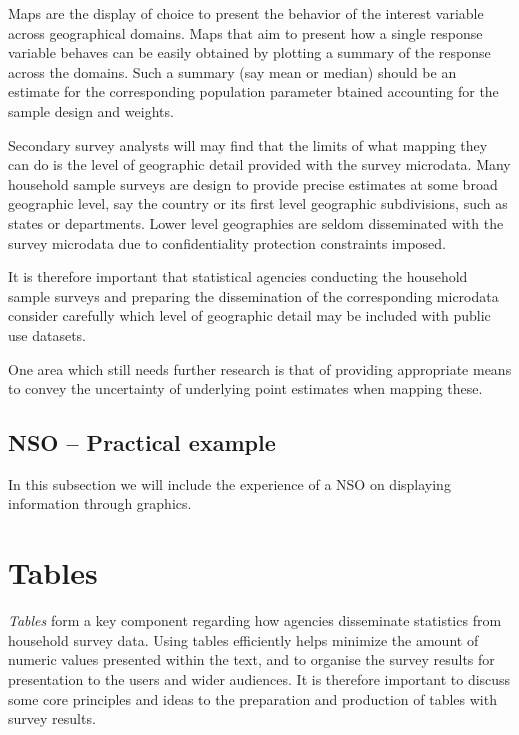 \documentclass[
  12pt,
]{book}
\begin{document}
Maps are the display of choice to present the behavior of the interest variable across geographical domains. Maps that aim to present how a single response variable behaves can be easily obtained by plotting a summary of the response across the domains. Such a summary (say mean or median) should be an estimate for the corresponding population parameter btained accounting for the sample design and weights.

Secondary survey analysts will may find that the limits of what mapping they can do is the level of geographic detail provided with the survey microdata. Many household sample surveys are design to provide precise estimates at some broad geographic level, say the country or its first level geographic subdivisions, such as states or departments. Lower level geographies are seldom disseminated with the survey microdata due to confidentiality protection constraints imposed.

It is therefore important that statistical agencies conducting the household sample surveys and preparing the dissemination of the corresponding microdata consider carefully which level of geographic detail may be included with public use datasets.

One area which still needs further research is that of providing appropriate means to convey the uncertainty of underlying point estimates when mapping these.

\hypertarget{nso-practical-example-3}{%
\section{NSO -- Practical example}\label{nso-practical-example-3}}

In this subsection we will include the experience of a NSO on displaying information through graphics.

\hypertarget{tables}{%
\chapter{Tables}\label{tables}}

\emph{Tables} form a key component regarding how agencies disseminate statistics from household survey data. Using tables efficiently helps minimize the amount of numeric values presented within the text, and to organise the survey results for presentation to the users and wider audiences. It is therefore important to discuss some core principles and ideas to the preparation and production of tables with survey results.
\end{document}
